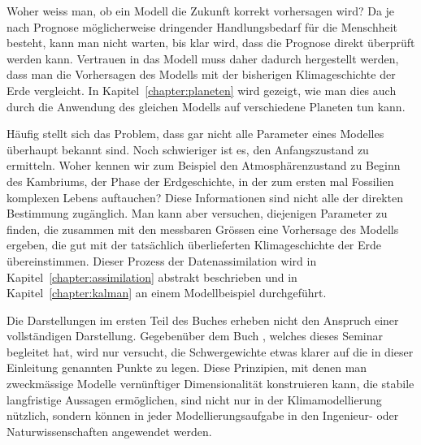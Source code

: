 Woher weiss man, ob ein Modell die Zukunft korrekt vorhersagen wird?
Da je nach Prognose möglicherweise dringender Handlungsbedarf für die
Menschheit besteht, kann man nicht warten, bis klar wird, dass die
Prognose direkt überprüft werden kann.
Vertrauen in das Modell muss daher dadurch hergestellt werden, dass
man die Vorhersagen des Modells mit der bisherigen Klimageschichte
der Erde vergleicht.
In Kapitel~\ref{chapter:planeten} wird gezeigt, wie man dies auch
durch die Anwendung des gleichen Modells auf verschiedene Planeten
tun kann.

Häufig stellt sich das Problem, dass gar nicht alle Parameter eines
Modelles überhaupt bekannt sind.
Noch schwieriger ist es, den Anfangszustand zu ermitteln.
Woher kennen wir zum Beispiel den Atmosphärenzustand zu Beginn des
Kambriums, der Phase der Erdgeschichte, in der zum ersten mal Fossilien
komplexen Lebens auftauchen?
Diese Informationen sind nicht alle der direkten Bestimmung
zugänglich.
Man kann aber versuchen, diejenigen Parameter zu finden, die zusammen
mit den messbaren Grössen eine Vorhersage des Modells ergeben, die
gut mit der tatsächlich überlieferten Klimageschichte der Erde 
übereinstimmen.
Dieser Prozess der Datenassimilation wird in
Kapitel~\ref{chapter:assimilation} abstrakt beschrieben und in
Kapitel~\ref{chapter:kalman} an einem Modellbeispiel durchgeführt.

Die Darstellungen im ersten Teil des Buches erheben nicht den Anspruch
einer vollständigen Darstellung.
Gegebenüber dem Buch \cite{skript:kaperengler}, welches dieses Seminar
begleitet hat, wird nur versucht, die Schwergewichte etwas klarer auf
die in dieser Einleitung genannten Punkte zu legen.
Diese Prinzipien, mit denen man zweckmässige Modelle vernünftiger
Dimensionalität konstruieren kann, die stabile langfristige
Aussagen ermöglichen, sind nicht nur in der Klimamodellierung
nützlich, sondern können in jeder Modellierungsaufgabe in den Ingenieur-
oder Naturwissenschaften angewendet werden.








